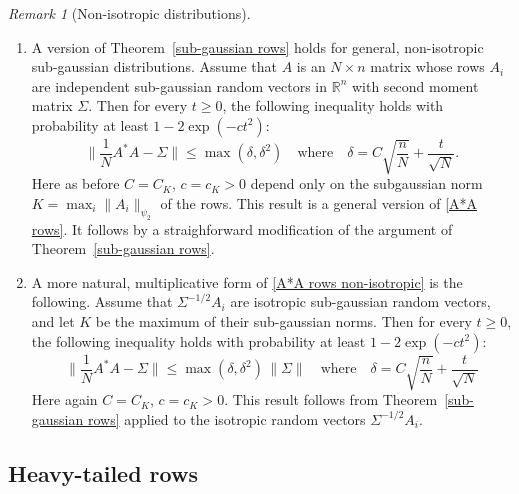 \documentclass[10pt, openany]{book}
\theoremstyle{remark}
\newtheorem{remark}[theorem]{Remark}
\def \R {\mathbb{R}}
\def \d {\delta}
\def \psitwo {{\psi_2}}
\begin{document}
\begin{remark}[Non-isotropic distributions]				\label{r: non-isotropic}		
\begin{enumerate}		
\item A version of Theorem~\ref{sub-gaussian rows} holds for general,
  non-isotropic sub-gaussian distributions. 
  Assume that $A$ is an $N \times n$ matrix whose rows $A_i$ are independent
  sub-gaussian random vectors in $\R^n$ with second moment matrix $\Sigma$. 
  Then for every $t \ge 0$, the following inequality holds with probability at least $1 - 2\exp(-ct^2)$:
  \begin{equation}							\label{A*A rows non-isotropic}
  \big\| \frac{1}{N}A^*A-\Sigma \big\| \le \max(\d, \d^2)
  \quad \text{where} \quad
  \d = C \sqrt{\frac{n}{N}} + \frac{t}{\sqrt{N}}.
  \end{equation}
  Here as before $C = C_K$, $c = c_K > 0$ depend only on the subgaussian norm 
  $K = \max_i \|A_i\|_\psitwo$ of the rows. This result is a general version of \eqref{A*A rows}.
  It follows by a straighforward modification of the argument of Theorem~\ref{sub-gaussian rows}.
\item A more natural, multiplicative form of \eqref{A*A rows non-isotropic} is the following. 
  Assume that $\Sigma^{-1/2} A_i$ are isotropic sub-gaussian random vectors, and let $K$
  be the maximum of their sub-gaussian norms. Then 
  for every $t \ge 0$, the following inequality holds with probability at least $1 - 2\exp(-ct^2)$:
  \begin{equation}							\label{A*A rows non-isotropic multiplicative}
  \big\| \frac{1}{N}A^*A-\Sigma \big\| \le \max(\d, \d^2) \, \|\Sigma\|
  \quad \text{where} \quad
  \d = C \sqrt{\frac{n}{N}} + \frac{t}{\sqrt{N}}
  \end{equation}
  Here again $C = C_K$, $c = c_K > 0$. This result follows from Theorem~\ref{sub-gaussian rows}
  applied to the isotropic random vectors $\Sigma^{-1/2} A_i$.
\end{enumerate}
\end{remark}





\subsection{Heavy-tailed rows}
  			\label{s: heavy-tailed rows}
\end{document}
